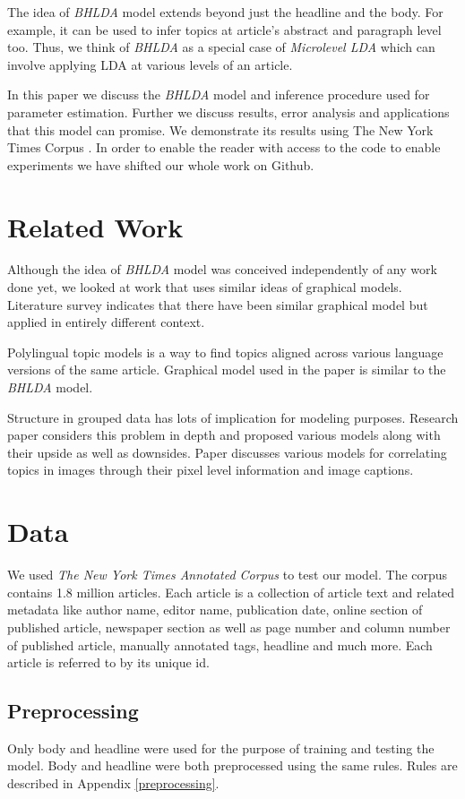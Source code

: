 \documentclass[a4paper]{article}
\begin{document}
The idea of \emph{BHLDA} model extends beyond just the headline and the body. For example, it can be used to infer topics at article's abstract and paragraph level too. Thus, we think of \emph{BHLDA} as a special case of \emph{Microlevel LDA} which can involve applying LDA at various levels of an article.

In this paper we discuss the \emph{BHLDA} model and inference procedure used for parameter estimation. Further we discuss results, error analysis and applications that this model can promise. We demonstrate its results using The New York Times Corpus \cite{corpus}. In order to enable the reader with access to the code to enable experiments we have shifted our whole work on Github.

\section{Related Work}
Although the idea of \emph{BHLDA} model was conceived independently of any work done yet, we looked at work that uses similar ideas of graphical models. Literature survey indicates that there have been similar graphical model but applied in entirely different context. 

Polylingual topic models \cite{ptm} is a way to find topics aligned across various language versions of the same article. Graphical model used in the paper is similar to the \emph{BHLDA} model. 

Structure in grouped data has lots of implication for modeling purposes. Research paper\cite{model_annotated_data} considers this problem in depth and proposed various models along with their upside as well as downsides. Paper discusses various models for correlating topics in images through their pixel level information and image captions. 


\section{Data}
We used \textit{The New York Times Annotated Corpus} \cite{corpus} to test our model. The corpus contains 1.8 million articles. Each article is a collection of article text and related metadata like author name, editor name, publication date, online section of published article, newspaper section as well as page number and column number of published article, manually annotated tags, headline and much more. Each article is referred to by its unique id. 

\subsection{Preprocessing}
Only body and headline were used for the purpose of training and testing the model. Body and headline were both preprocessed using the same rules. Rules are described in Appendix \ref{preprocessing}.
\end{document}
